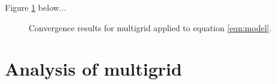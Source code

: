 Figure \ref{fig:model} below...

\begin{figure}[h]
	\centering

	\caption{Convergence results for multigrid applied to equation \eqref{eqn:model}. \label{fig:model}}
\end{figure}






\section{Analysis of multigrid}



